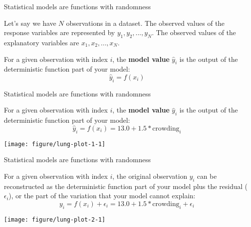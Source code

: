 \documentclass[table]{beamer}\usepackage[]{graphicx}\usepackage[]{color}
\makeatletter
\def\maxwidth{ %
  \ifdim\Gin@nat@width>\linewidth
    \linewidth
  \else
    \Gin@nat@width
  \fi
}
\newenvironment{knitrout}{}{} %
\makeatother
\begin{document}

\begin{frame}[fragile]{Statistical models are functions with randomness}

\bi
\myitem Let's say we have $N$ observations in a dataset. The observed values of the response variables are represented by $y_1, y_2, ..., y_N$. 
\myitem The observed values of the explanatory variables are $x_1, x_2, ..., x_N$.

\myitem For a given observation with index $i$, the {\bf model value} $\hat y_i$ is the output of the deterministic function part of your model:
$$ \hat y_i = f(x_i) $$

\ei


\end{frame}



\begin{frame}[fragile]{Statistical models are functions with randomness}

For a given observation with index $i$, the {\bf model value} $\hat y_i$ is the output of the deterministic function part of your model:
$$ \hat y_i = f(x_i) = 13.0 + 1.5*\mbox{crowding}_i $$

\begin{knitrout}\footnotesize
{}\color{fgcolor}
\texttt{[image: figure/lung-plot-1-1]} 

\end{knitrout}



\end{frame}




\begin{frame}[fragile]{Statistical models are functions with randomness}


For a given observation with index $i$, the original observation $y_i$ can be reconstructed as  the deterministic function part of your model plus the residual ($\epsilon_i$), or the part of the variation that your model cannot explain:
$$ y_i = f(x_i) + \epsilon_i = 13.0 + 1.5*\mbox{crowding}_i + \epsilon_i$$

\begin{knitrout}\footnotesize
{}\color{fgcolor}
\texttt{[image: figure/lung-plot-2-1]} 

\end{knitrout}

\end{frame}
\end{document}
